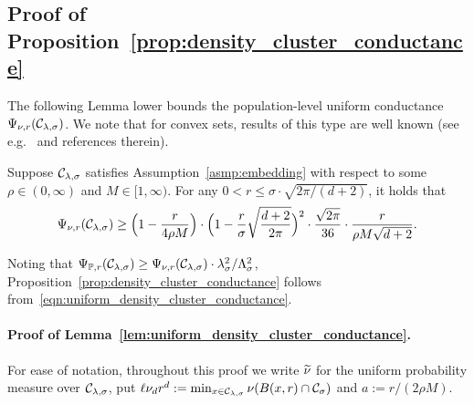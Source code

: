 \subsection{Proof of Proposition~\ref{prop:density_cluster_conductance}}
\label{subsec:density_cluster_conductance}
The following Lemma lower bounds the population-level uniform conductance $\Psi_{\nu,r}(\mathcal{C}_{\lambda,\sigma})$. We note that for convex sets, results of this type are well known (see e.g.~\cite{vempala2005} and references therein).  
\begin{lemma}
	\label{lem:uniform_density_cluster_conductance}
	Suppose $\mathcal{C}_{\lambda,\sigma}$ satisfies Assumption~\ref{asmp:embedding} with respect to some $\rho \in (0,\infty)$ and $M \in [1,\infty)$. For any $0 < r \leq \sigma \cdot \sqrt{2\pi/(d + 2)}$, it holds that
	\begin{equation}
	\label{eqn:uniform_density_cluster_conductance}
	\Psi_{\nu,r}(\mathcal{C}_{\lambda,\sigma}) \geq \Bigl(1 - \frac{r}{4\rho M}\Bigr) \cdot \Bigl(1 - \frac{r}{\sigma}\sqrt{\frac{d + 2}{2\pi}}\Bigr)^2 \cdot \frac{\sqrt{2\pi}}{36} \cdot \frac{r}{\rho M \sqrt{d + 2}}.
	\end{equation}
\end{lemma}
Noting that $\Psi_{\mathbb{P},r}(\mathcal{C}_{\lambda,\sigma}) \geq \Psi_{\nu,r}(\mathcal{C}_{\lambda,\sigma}) \cdot \lambda_{\sigma}^2/\Lambda_{\sigma}^2$, Proposition~\ref{prop:density_cluster_conductance} follows from~\eqref{eqn:uniform_density_cluster_conductance}. 

\paragraph{Proof of Lemma~\ref{lem:uniform_density_cluster_conductance}.}
	For ease of notation, throughout this proof we write $\widetilde{\nu}$ for the uniform probability measure over $\mathcal{C}_{\lambda,\sigma}$, put $\ell \nu_d r^d := \min_{x \in \mathcal{C}_{\lambda,\sigma}}\nu(B(x,r) \cap \mathcal{C}_{\sigma})$ and $a := r/(2\rho M)$. 
	
